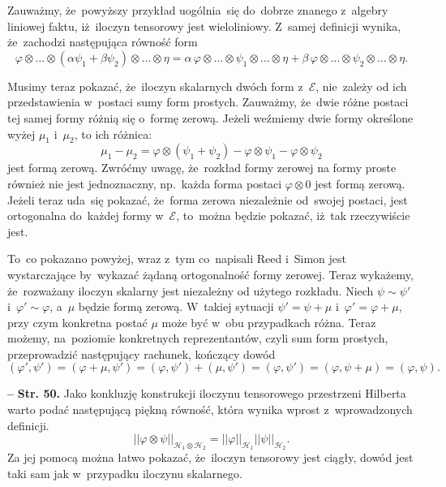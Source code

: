 \documentclass[a4paper,11pt]{article}
\newcommand{\ld}{\ldots}
\newcommand{\mc}{\mathcal}
\newcommand{\al}{\alpha}
\newcommand{\vp}{\varphi}
\newcommand{\Hc}{\mc{H}}
\newcommand{\ot}{\otimes}
\newcommand{\norm}[1]{\left|\left| #1 \right|\right|}
\newcommand{\tb}{\textbf}
\newcommand{\noi}{\noindent}
\newcommand{\start}{\noi \tb{--} {}}
\newcommand{\Str}[1]{\tb{Str. #1.}}
\begin{document}
Zauważmy, że~powyższy przykład uogólnia~się do~dobrze znanego
z~algebry liniowej faktu, iż~iloczyn tensorowy jest wieloliniowy.
Z~samej definicji wynika, że~zachodzi następująca równość form
\begin{displaymath}
  \vp \ot \ld \ot ( \al \psi_{ 1 } + \beta \psi_{ 2 } ) \ot \ld \ot \eta
  = \al \, \vp \ot \ld \ot \psi_{ 1 } \ot \ld \ot \eta
  + \beta \, \vp \ot \ld \ot \psi_{ 2 } \ot \ld \ot \eta.
\end{displaymath}

Musimy teraz pokazać, że~iloczyn skalarnych dwóch form z~$\mc{E}$,
nie~zależy od ich przedstawienia w~postaci sumy form prostych.
Zauważmy, że~dwie różne postaci tej samej formy różnią się o~formę
zerową. Jeżeli weźmiemy dwie formy określone wyżej $\mu_{ 1 }$
i~$\mu_{ 2 }$, to ich różnica:
\begin{displaymath}
  \mu_{ 1 } - \mu_{ 2 } = \vp \ot ( \psi_{ 1 } + \psi_{ 2 } )
  - \vp \ot \psi_{ 1 } - \vp \ot \psi_{ 2 }
\end{displaymath}
jest formą zerową. Zwróćmy uwagę, że~rozkład formy zerowej na formy
proste również nie jest jednoznaczny, np.~każda forma postaci
$\vp \ot 0$ jest formą zerową. Jeżeli teraz uda~się pokazać, że~forma
zerowa niezależnie od~swojej postaci, jest ortogonalna do~każdej formy
w~$\mc{E}$, to~można będzie pokazać, iż~tak rzeczywiście jest.

To~co pokazano powyżej, wraz z~tym co~napisali Reed i~Simon jest
wystarczające by~wykazać żądaną ortogonalność formy zerowej. Teraz
wykażemy, że~rozważany iloczyn skalarny jest niezależny od użytego
rozkładu. Niech $\psi \sim \psi'$ i~$\vp' \sim \vp$, a~$\mu$ będzie
formą zerową. W~takiej sytuacji $\psi' = \psi + \mu$
i~$\vp' = \vp + \mu$, przy czym konkretna postać $\mu$ może być w~obu
przypadkach różna. Teraz możemy, na~poziomie konkretnych
reprezentantów, czyli sum form prostych, przeprowadzić następujący
rachunek, kończący dowód
\begin{displaymath}
  ( \vp', \psi' ) = ( \vp + \mu, \psi' ) = ( \vp, \psi' ) + ( \mu, \psi' )
  = ( \vp, \psi' ) = ( \vp, \psi + \mu ) = ( \vp, \psi ).
\end{displaymath}

\start \Str{50} Jako konkluzję konstrukcji iloczynu tensorowego
przestrzeni Hilberta warto podać następującą piękną równość, która
wynika wprost z~wprowadzonych definicji.
\begin{displaymath}
  \norm{ \vp \ot \psi }_{ \Hc_{ 1 } \ot \Hc_{ 2 } }
  = \norm{ \vp }_{ \Hc_{ 1 } } \norm{ \psi }_{ \Hc_{ 2 } }.
\end{displaymath}
Za jej pomocą można łatwo pokazać, że~iloczyn tensorowy jest ciągły,
dowód jest taki sam jak w~przypadku iloczynu skalarnego.
\end{document}
